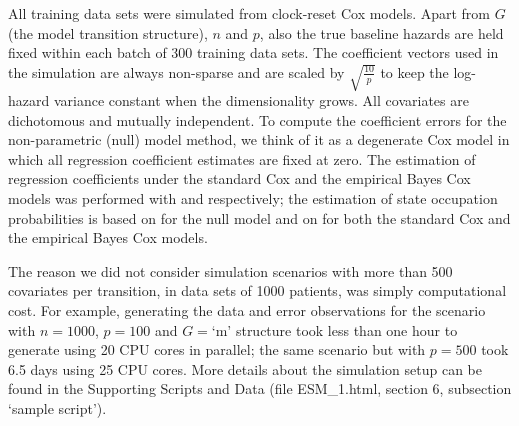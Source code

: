 All training data sets were simulated from clock-reset Cox models. Apart from $G$ (the model transition structure), $n$ and $p$, also the true baseline hazards are held fixed within each batch of 300 training data sets.  
The coefficient vectors used in the simulation are always non-sparse and are scaled by $\sqrt{\frac{10}{p}}$ to keep the log-hazard variance constant when the dimensionality grows.  
All covariates are dichotomous and mutually independent.
To compute the coefficient errors for the non-parametric (null) model method, we think of it as a degenerate Cox model in which all regression coefficient estimates are fixed at zero. 
The estimation of regression coefficients under the standard Cox and the empirical Bayes Cox models was performed with  and  respectively; the estimation of state occupation probabilities is based on  for the null model and on  for both the standard Cox and the empirical Bayes Cox models.

 The reason we did not consider simulation scenarios with more than 500 covariates per transition, in data sets of 1000 patients, was simply computational cost. For example, generating the data and error observations for the scenario with $n=1000$, $p=100$ and $G=$`m' structure took less than one hour to generate using 20 CPU cores in parallel; the same scenario but with $p=500$ took 6.5 days using 25 CPU cores. More details about the simulation setup can be found in the Supporting Scripts and Data (file ESM\_1.html, section 6,  subsection `sample script').


